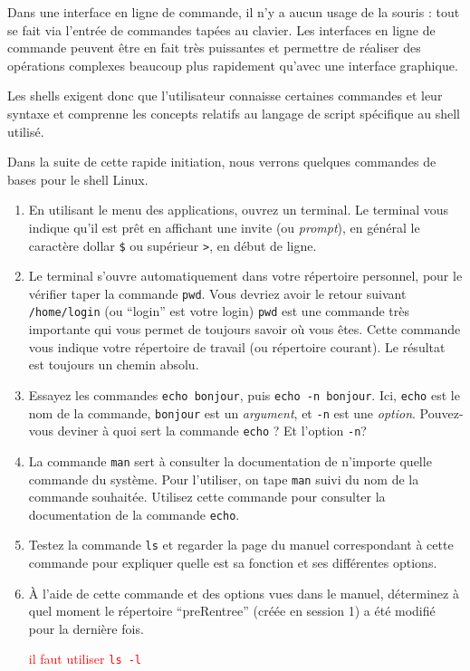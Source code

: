\documentclass{article}
\begin{document}
Dans une interface en ligne de commande, il n’y a aucun usage de la souris : tout se fait via l’entrée de commandes tapées au clavier. Les interfaces en ligne de commande peuvent être en fait très puissantes et permettre de réaliser des opérations complexes beaucoup plus rapidement qu’avec une interface graphique.

Les shells exigent donc que l’utilisateur connaisse certaines commandes et leur syntaxe et comprenne les concepts relatifs au langage de script spécifique au shell utilisé.

Dans la suite de cette rapide initiation, nous verrons quelques commandes de bases pour le shell Linux. 

\begin{exercice}

\begin{enumerate}
\def\labelenumi{\arabic{enumi}.}
\item
  En utilisant le menu des applications, ouvrez un terminal. Le terminal
  vous indique qu'il est prêt en affichant une invite (ou
  \emph{prompt}), en général le caractère dollar \texttt{\$} ou
  supérieur \texttt{\textgreater{}}, en début de ligne.  
\item
Le terminal s'ouvre automatiquement dans votre répertoire personnel, pour le vérifier taper la commande \texttt{pwd}. 
Vous devriez avoir le retour suivant \texttt{/home/login} (ou ``login'' est votre login)
\texttt{pwd} est une commande très importante qui vous permet de toujours savoir où vous êtes. Cette commande vous indique votre répertoire de travail (ou répertoire courant). 
Le résultat est toujours un chemin absolu.
\item
  Essayez les commandes \texttt{echo\ bonjour}, puis
  \texttt{echo\ -n\ bonjour}. Ici, \texttt{echo} est le nom de la
  commande, \texttt{bonjour} est un \emph{argument}, et \texttt{-n} est
  une \emph{option}. Pouvez-vous deviner à quoi sert la commande
  \texttt{echo} ? Et l'option \texttt{-n}?
\item
  La commande \texttt{man} sert à consulter la documentation de
  n'importe quelle commande du système. Pour l'utiliser, on tape
  \texttt{man} suivi du nom de la commande souhaitée. Utilisez cette
  commande pour consulter la documentation de la commande \texttt{echo}.
\item
  Testez la commande \texttt{ls} et regarder la page du manuel
  correspondant à cette commande pour expliquer quelle est sa fonction et ses différentes options.
\item
  À l'aide de cette commande et des options vues dans le manuel, déterminez à quel moment le répertoire
  ``preRentree''  (créée en session 1) a été modifié pour la dernière fois.

\begin{correction}
  \textcolor{red}{il faut utiliser \texttt{ls -l}}
\end{correction}

\end{enumerate}
\end{exercice}
\end{document}

